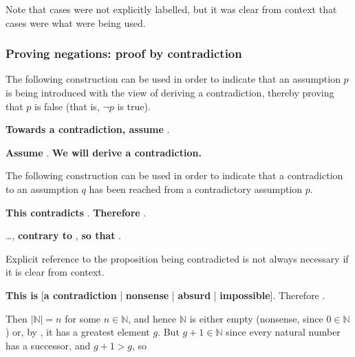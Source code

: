 Note that cases were not explicitly labelled, but it was clear from context that cases were what were being used.

\subsubsection*{Proving negations: proof by contradiction} 

\begin{vocabulary}
\label{vcbContradiction}
The following construction can be used in order to indicate that an assumption $p$ is being introduced with the view of deriving a contradiction, thereby proving that $p$ is false (that is, $\neg p$ is true).

\begin{vocabtemplate}
\textbf{Towards a contradiction, assume} .

\vtor

\textbf{Assume} . \textbf{We will derive a contradiction.}
\end{vocabtemplate}

The following construction can be used in order to indicate that a contradiction to an assumption $q$ has been reached from a contradictory assumption $p$.

\begin{vocabtemplate}
\textbf{This contradicts} . \textbf{Therefore} .

\vtor

\dots{}, \textbf{contrary to} , \textbf{so that} .
\end{vocabtemplate}

Explicit reference to the proposition being contradicted is not always necessary if it is clear from context.

\begin{vocabtemplate}
\textbf{This is} [\textbf{a contradiction} | \textbf{nonsense} | \textbf{absurd} | \textbf{impossible}]. Therefore .
\end{vocabtemplate}
\end{vocabulary}

\begin{extract}
\label{xtrContradictionExample}
 Then $|\mathbb{N}| = n$ for some $n \in \mathbb{N}$, and hence $\mathbb{N}$ is either empty (nonsense, since $0 \in \mathbb{N}$) or, by , it has a greatest element $g$. But $g+1 \in \mathbb{N}$ since every natural number has a successor, and $g+1 > g$, so 
\end{extract}

